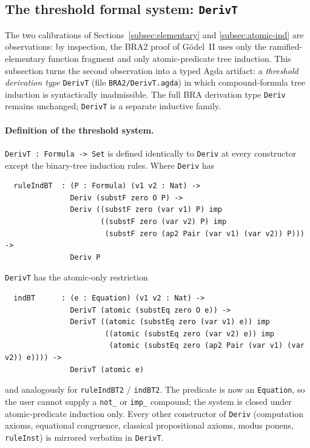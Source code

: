 \documentclass[11pt]{article}
\begin{document}
\subsection{The threshold formal system: \texttt{DerivT}}
\label{subsec:threshold-system}

The two calibrations of Sections~\ref{subsec:elementary} and
\ref{subsec:atomic-ind} are observations: by inspection, the BRA2
proof of G\"odel~II uses only the ramified-elementary function
fragment and only atomic-predicate tree induction.  This subsection
turns the second observation into a typed Agda artifact: a
\emph{threshold derivation type} \verb|DerivT| (file
\verb|BRA2/DerivT.agda|) in which compound-formula tree induction is
syntactically inadmissible.  The full BRA derivation type
\verb|Deriv| remains unchanged; \verb|DerivT| is a separate
inductive family.

\paragraph{Definition of the threshold system.}
\verb|DerivT : Formula -> Set| is defined identically to
\verb|Deriv| at every constructor except the binary-tree
induction rules.  Where \verb|Deriv| has
\begin{verbatim}
  ruleIndBT  : (P : Formula) (v1 v2 : Nat) ->
               Deriv (substF zero O P) ->
               Deriv ((substF zero (var v1) P) imp
                      ((substF zero (var v2) P) imp
                       (substF zero (ap2 Pair (var v1) (var v2)) P))) ->
               Deriv P
\end{verbatim}
\verb|DerivT| has the atomic-only restriction
\begin{verbatim}
  indBT      : (e : Equation) (v1 v2 : Nat) ->
               DerivT (atomic (substEq zero O e)) ->
               DerivT ((atomic (substEq zero (var v1) e)) imp
                       ((atomic (substEq zero (var v2) e)) imp
                        (atomic (substEq zero (ap2 Pair (var v1) (var v2)) e)))) ->
               DerivT (atomic e)
\end{verbatim}
and analogously for \verb|ruleIndBT2| / \verb|indBT2|.  The
predicate is now an \verb|Equation|, so the user cannot supply a
\verb|not_| or \verb|imp_| compound; the system is closed under
atomic-predicate induction only.  Every other constructor of
\verb|Deriv| (computation axioms, equational congruence, classical
propositional axioms, modus ponens, \verb|ruleInst|) is mirrored
verbatim in \verb|DerivT|.
\end{document}

